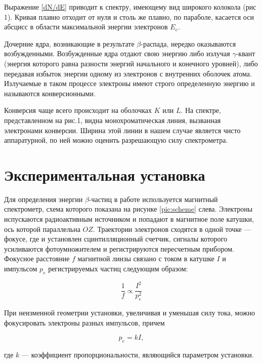 \documentclass[a4paper, 12pt]{article}%
\begin{document}
	
	Выражение \eqref{dN/dE} приводит к спектру, имеющему вид широкого колокола (рис 1). Кривая плавно отходит от нуля и столь же плавно, по параболе, касается оси абсцисс в области максимальной энергии электронов $E_e$. 
	
	Дочерние ядра, возникающие в результате $\beta$-распада, нередко оказываются возбужденными. Возбужденные ядра отдают свою энергию либо излучая $\gamma$-квант (энергия которого равна разности энергий начального и конечного уровней), либо передавая избыток энергии одному из электронов с внутренних оболочек атома. Излучаемые в таком процессе электроны имеют строго определенную энергию и называются конверсионными.
	
	Конверсия чаще всего происходит на оболочках $ K $ или $ L $. На спектре, представленном на рис.1, видна монохроматическая линия, вызванная электронами конверсии. Ширина этой линии в нашем случае является чисто аппаратурной, по ней можно оценить разрешающую силу спектрометра.
	
	
	\section{Экспериментальная установка}
	
	Для определения энергии $\beta$-частиц в работе используется магнитный спектрометр, схема которого показана на рисунке \ref{pic:scheme} слева. Электроны испускаются радиоактивным источником и попадают в магнитное поле катушки, ось которой параллельна $OZ$. Траектории электронов сходятся в одной точке --- фокусе, где и установлен сцинтилляционный счетчик, сигналы которого усиливаются фотоумножителем и регистрируются пересчетным прибором. Фокусное расстояние $f$ магнитной линзы связано с током в катушке $I$ и импульсом $p_e$ регистрируемых частиц следующим образом:
	
	\[ \frac{1}{f} \propto \frac{I^2}{p_e^2} \]  
	
	При неизменной геометрии установки, увеличивая и уменьшая силу тока, можно фокусировать электроны разных импульсов, причем 
	
	\begin{equation}\label{k}
		p_e = kI,
	\end{equation}
	
	где $k$ --- коэффициент пропорциональности, являющийся параметром установки.
	
\end{document}
